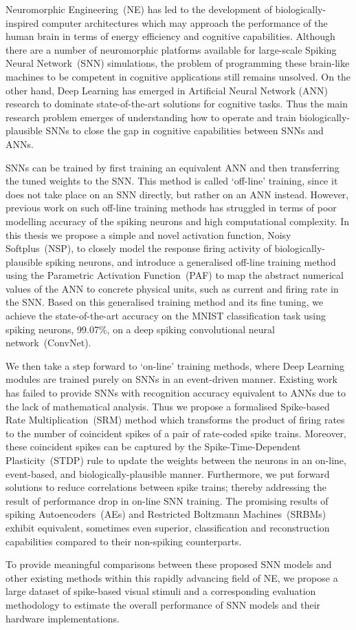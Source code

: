 Neuromorphic Engineering~(NE) has led to the development of biologically-inspired computer architectures which may approach the performance of the human brain in terms of energy efficiency and cognitive capabilities.
Although there are a number of neuromorphic platforms available for large-scale Spiking Neural Network~(SNN) simulations, the problem of programming these brain-like machines to be competent in cognitive applications still remains unsolved.
On the other hand, Deep Learning has emerged in Artificial Neural Network (ANN) research to dominate state-of-the-art solutions for cognitive tasks.
Thus the main research problem emerges of understanding how to operate and train biologically-plausible SNNs to close the gap in cognitive capabilities between SNNs and ANNs.

SNNs can be trained by first training an equivalent ANN and then transferring the tuned weights to the SNN.
This method is called `off-line' training, since it does not take place on an SNN directly, but rather on an ANN instead.
However, previous work on such off-line training methods has struggled in terms of poor modelling accuracy of the spiking neurons and high computational complexity.
In this thesis we propose a simple and novel activation function, Noisy Softplus~(NSP), to closely model the response firing activity of biologically-plausible spiking neurons,
and introduce a generalised off-line training method using the Parametric Activation Function~(PAF) to map the abstract numerical values of the ANN to concrete physical units, such as current and firing rate in the SNN.
Based on this generalised training method and its fine tuning, we achieve the state-of-the-art accuracy on the MNIST classification task using spiking neurons, 99.07\%, on a deep spiking convolutional neural network~(ConvNet).


We then take a step forward to `on-line' training methods, where Deep Learning modules are trained purely on SNNs in an event-driven manner.
Existing work has failed to provide SNNs with recognition accuracy equivalent to ANNs due to the lack of mathematical analysis. 
Thus we propose a formalised Spike-based Rate Multiplication~(SRM) method which transforms the product of firing rates to the number of coincident spikes of a pair of rate-coded spike trains.
Moreover, these coincident spikes can be captured by the Spike-Time-Dependent Plasticity~(STDP) rule to update the weights between the neurons in an on-line, event-based, and biologically-plausible manner.
Furthermore, we put forward solutions to reduce correlations between spike trains; thereby addressing the result of performance drop in on-line SNN training. 
The promising results of spiking Autoencoders~(AEs) and Restricted Boltzmann Machines~(SRBMs) exhibit equivalent, sometimes even superior, classification and reconstruction capabilities compared to their non-spiking counterparts.

To provide meaningful comparisons between these proposed SNN models and other existing methods within this rapidly advancing field of NE, we propose a large dataset of spike-based visual stimuli and a corresponding evaluation methodology to estimate the overall performance of SNN models and their hardware implementations.
